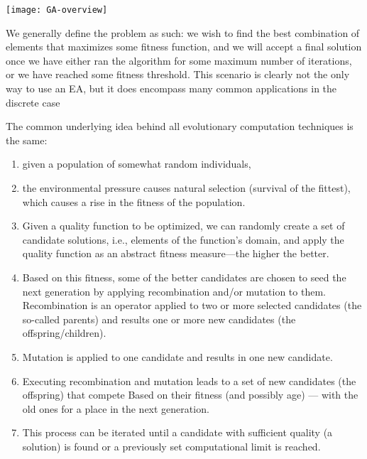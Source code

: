 \begin{marginfigure}
\texttt{[image: GA-overview]}
\end{marginfigure}

We generally define the problem as such: we wish to find the best combination of elements that maximizes some fitness function, and we will accept a final solution once we have either ran the algorithm for some maximum number of iterations, or we have reached some fitness threshold. This scenario is clearly not the only way to use an EA, but it does encompass many common applications in the discrete case

The common underlying idea behind all evolutionary computation techniques is the same\cite{Eiben2015}:
\begin{enumerate}
\begin{marginfigure}
\texttt{[image: eibenGA01]}
\end{marginfigure}

\item given a population of somewhat random individuals,

\item the environmental pressure causes natural selection (survival of the fittest), which causes a rise in the fitness of the population.

\item Given a quality function to be optimized, we can randomly create a set of candidate solutions, i.e., elements of the function's domain, and apply the quality function as an abstract fitness measure---the higher the better.

\item Based on this fitness, some of the better candidates are chosen to seed the next generation by applying recombination and/or mutation to them. Recombination is an operator applied to two or more selected candidates (the so-called parents) and results one or more new candidates (the offspring/children).

\item Mutation is applied to one candidate and results in one new candidate.

\item Executing recombination and mutation leads to a set of new candidates (the offspring) that compete Based on their fitness (and possibly age) --- with the old ones for a place in the next generation.

\item This process can be iterated until a candidate with sufficient quality (a solution) is found or a previously set computational limit is reached.
\end{enumerate}

